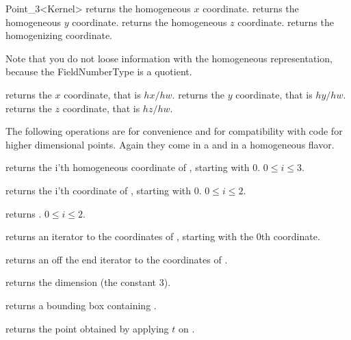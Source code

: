 \begin{ccRefClass} {Point_3<Kernel>}
       {returns the homogeneous $x$ coordinate.}
\ccGlue
{}
       {returns the homogeneous $y$ coordinate.}
\ccGlue
{}
       {returns the homogeneous $z$ coordinate.}
\ccGlue
{}
       {returns the homogenizing coordinate.}

Note that you do not loose information with the homogeneous
representation, because the FieldNumberType is a quotient.

       {returns the  $x$ coordinate, that is $hx/hw$.}
\ccGlue
{}
       {returns the  $y$ coordinate, that is $hy/hw$.}
\ccGlue
{}
       {returns the  $z$ coordinate, that is $hz/hw$.}

The following operations are for convenience and for compatibility
with code for higher dimensional points. Again they come in a
 and in a homogeneous flavor.

       {returns the i'th homogeneous coordinate of \ccVar, starting with 0.
        \ccPrecond $0\leq i \leq 3$.}

       {returns the i'th  coordinate of \ccVar, starting with 0.
        \ccPrecond $0\leq i \leq 2$.}

       {returns .
        \ccPrecond $0\leq i \leq 2$.}

       {returns an iterator to the  coordinates 
        of \ccVar, starting with the 0th coordinate.}

       {returns an off the end iterator to the  
        coordinates of \ccVar.}

       {returns the dimension (the constant 3).}

       {returns a bounding box containing \ccVar.}

       {returns the point obtained by applying $t$ on \ccVar.}


\end{ccRefClass}
